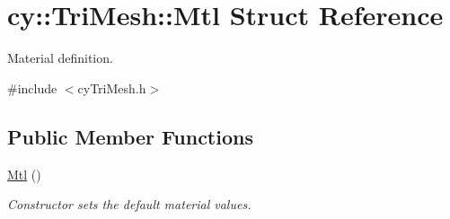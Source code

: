 \hypertarget{structcy_1_1_tri_mesh_1_1_mtl}{}\section{cy\+::Tri\+Mesh\+::Mtl Struct Reference}
\label{structcy_1_1_tri_mesh_1_1_mtl}


Material definition.  




{\ttfamily \#include $<$cy\+Tri\+Mesh.\+h$>$}

\subsection*{Public Member Functions}
\begin{DoxyCompactItemize}
\item 
\mbox{\label{structcy_1_1_tri_mesh_1_1_mtl_a797aeccd81b03058231cf4303d258ad7}} 
\mbox{\hyperlink{structcy_1_1_tri_mesh_1_1_mtl_a797aeccd81b03058231cf4303d258ad7}{Mtl}} ()
\begin{DoxyCompactList}\small\item\em Constructor sets the default material values. \end{DoxyCompactList}\end{DoxyCompactItemize}
